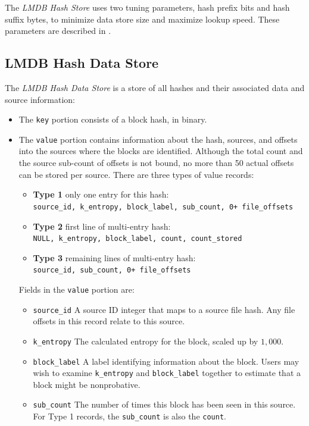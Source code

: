 \documentclass[11pt,fleqn]{article} %
\begin{document}
The \textit{LMDB Hash Store} uses two tuning parameters, hash prefix bits and hash suffix bytes, to minimize data store size and maximize lookup speed.  These parameters are described in \textbf{}.\\


\subsection{LMDB Hash Data Store}
The \textit{LMDB Hash Data Store} is a store of all hashes and their associated data and source information:

\begin{itemize}
\item The \verb+key+ portion consists of a block hash, in binary.
\item The \verb+value+ portion contains information about the hash, sources, and offsets into the sources where the blocks are identified. Although the total count and the source sub-count of offsets is not bound, no more than 50 actual offsets can be stored per source.  There are three types of value records:
  \begin{itemize}
  \item \textbf{Type 1} only one entry for this hash:\\
\verb-source_id, k_entropy, block_label, sub_count, 0+ file_offsets-
  \item \textbf{Type 2} first line of multi-entry hash:\\
\verb-NULL, k_entropy, block_label, count, count_stored-
  \item \textbf{Type 3} remaining lines of multi-entry hash:\\
\verb-source_id, sub_count, 0+ file_offsets-
  \end{itemize}
Fields in the \verb+value+ portion are:
  \begin{itemize}
  \item \verb+source_id+ A source ID integer that maps to a source file hash. Any file offsets in this record relate to this source.
  \item \verb+k_entropy+ The calculated entropy for the block, scaled up by $1,000$.
  \item \verb+block_label+ A label identifying information about the block.  Users may wish to examine \verb+k_entropy+ and \verb+block_label+ together to estimate that a block might be nonprobative.
  \item \verb+sub_count+ The number of times this block has been seen in this source. For Type 1 records, the \verb+sub_count+ is also the \verb+count+.

\end{itemize}
\end{itemize}
\end{document}
